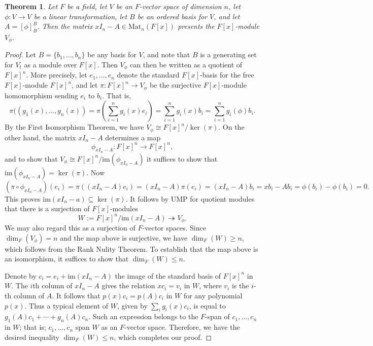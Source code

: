\documentclass[12pt]{report}
\newtheorem{theorem}{Theorem}[chapter]
\numberwithin{equation}{section}
\numberwithin{theorem}{chapter}
\theoremstyle{definition}
\newtheorem*{basic properties}{Basic Properties}
\newtheorem*{Important Remark}{Important Remark}
\renewcommand{\ker}{\operatorname{ker}}
\begin{document}
 
\begin{theorem}\label{presents F[x] module}
Let $F$ be a field, let $V$ be an $F$-vector space of dimension $n$, let $\phi\!: V \to V$ be a linear transformation, let $B$ be an ordered basis for $V$, and let $A = [\phi]_B^B$. Then the matrix $xI_n - A \in \mathrm{Mat}_n(F[x])$ presents the $F[x]$-module $V_\phi$.
\end{theorem}

\begin{proof} 
Let $B=\{b_1, \dots, b_n\}$ be any basis for $V$, and note that $B$ is a generating set for $V_t$ as a module over $F[x]$. Then $V_\phi$ can then be written as a quotient of $F[x]^n$. More precisely, let $e_1, \dots, e_n$ denote the standard $F[x]$-basis for the free $F[x]$-module $F[x]^n$, and let $\pi\!: F[x]^n \to V_\phi$ be the surjective $F[x]$-module homomorphism sending $e_i$ to $b_i$. That is,
$$
\pi((g_1(x), \dots, g_n(x)) = \pi \left( \sum_{i=1}^n g_i(x) e_i \right) = \sum_{i=1}^n g_i(x) b_i = \sum_{i=1}^n g_i(\phi) b_i.
$$
By the First Isomorphism Theorem, we have $V_\phi\cong F[x]^n/\ker(\pi)$. On the other hand, the matrix $xI_n - A$ determines a map
$$\phi_{xI_n - A}: F[x]^n \to F[x]^n,$$
and to show that $V_\phi\cong F[x]^n/\mathrm{im}(\phi_{xI_n - A})$ it suffices to show  that $\mathrm{im}(\phi_{xI_n - A}) = \ker(\pi)$.
Now
$$(\pi \circ \phi_{xI_n - A})(e_i)=\pi((xI_n - A)e_i)=(xI_n - A)\pi(e_i)=(xI_n - A)b_i=xb_i-Ab_i=\phi(b_i)-\phi(b_i)=0.$$ 
This proves $\mathrm{im}(xI_n - a) \subseteq \ker(\pi)$. It follows by UMP for quotient modules that there is a surjection of $F[x]$-modules
$$W := F[x]^n/\mathrm{im}(xI_n - A) \twoheadrightarrow V_\phi.$$
We may also regard this as a surjection of $F$-vector spaces. Since $\dim_F(V_\phi) = n$ and the map above is surjective, we have $\dim_F(W)\geqslant n$, which follows from the Rank Nulity Theorem. To establish that the map above is an isomorphism, it suffices to show that $\dim_F(W) \leqslant n$. 

Denote by $c_i=e_i+\mathrm{im}(xI_n - A)$ the image of the standard basis of $F[x]^n$ in $W$.
The $i$th column of $xI_n - A$ gives the relation $x c_i = v_i$ in
$W$, where $v_i$ is the $i$-th column of $A$. It follows that $p(x) c_i = p(A) c_i$ in $W$ for any
polynomial $p(x)$. Thus a typical element of $W$, given by $\sum_i g_i(x) c_i$, is equal to $g_1(A) c_1 + \cdots + g_n(A) c_n$. Such an
expression belongs to the $F$-span of $c_1, \ldots, c_n$ in $W$; that is;
$c_1, \ldots, c_n$ span $W$ as an $F$-vector space. Therefore, we have the desired inequality $\dim_F(W) \leqslant n$, which completes our proof.
\end{proof}
\end{document}
